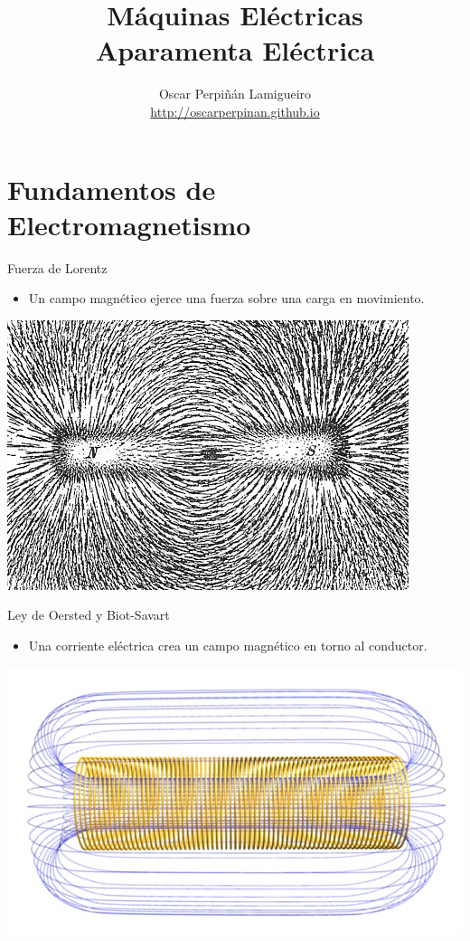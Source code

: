 \documentclass[xcolor={usenames,svgnames,dvipsnames}]{beamer}
\author{Oscar Perpiñán Lamigueiro \\ \url{http://oscarperpinan.github.io}}
\date{}
\title{Máquinas Eléctricas \\ Aparamenta Eléctrica}
\begin{document}
\maketitle

\section{Fundamentos de Electromagnetismo}
\label{sec:orga222c96}


\begin{frame}[label={sec:org76563ac}]{Fuerza de Lorentz}
\begin{itemize}
\item Un campo magnético ejerce una fuerza sobre una carga en movimiento.
\end{itemize}

\begin{center}
\includegraphics[width=.9\linewidth]{../figs/Magnet0873.png}
\end{center}
\end{frame}

\begin{frame}[label={sec:org85b92ee}]{Ley de Oersted y Biot-Savart}
\begin{itemize}
\item Una corriente eléctrica crea un campo magnético en torno al
conductor.
\end{itemize}

\begin{center}
\includegraphics[width=.9\linewidth]{../figs/Solenoide.jpg}
\end{center}
\end{frame}
\end{document}
